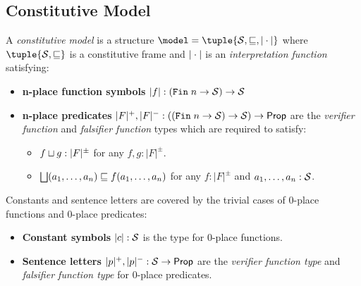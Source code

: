 \documentclass[../LogosReference.tex]{subfiles}
\begin{document}
\subsection{Constitutive Model}\label{sec:constitutive-model}



\begin{definition}\label{def:constitutive-model}
	A \emph{constitutive model} is a structure $\model = \tuple{\statespace, \parthood, \interp{\cdot}}$ where $\tuple{\statespace, \parthood}$ is a constitutive frame and $|\cdot|$ is an \textit{interpretation function} satisfying:
	\begin{itemize}
		\item \textbf{n-place function symbols} $|f| : (\mathtt{Fin}\;n \to \mathcal{S}) \to \mathcal{S}$
    \item \textbf{n-place predicates} $|{F}|^+, |{F}|^- : ((\mathtt{Fin}\;n \to \mathcal{S}) \to \mathcal{S}) \to \mathsf{Prop}$ are the \textit{verifier function} and \textit{falsifier function} types which are required to satisfy:
		      \begin{itemize}
            \item $f\sqcup g : |F|^\pm$ for any $f, g : |F|^\pm$.
			      \item $\bigsqcup(a_1, \ldots, a_n) \sqsubseteq f(a_1, \ldots, a_n)$ for any $f : |F|^\pm$ and $a_1, \ldots, a_n : \mathcal{S}$.
		      \end{itemize}
	\end{itemize}
\end{definition}

\begin{remark}\label{rem:trivial-cases}
	Constants and sentence letters are covered by the trivial cases of 0-place functions and 0-place predicates:
	\begin{itemize}
		\item \textbf{Constant symbols} $|c| : \mathcal{S}$ is the type for 0-place functions.
		\item \textbf{Sentence letters} $|{p}|^+, |{p}|^- : \mathcal{S} \to \mathsf{Prop}$ are the \textit{verifier function type} and \textit{falsifier function type} for 0-place predicates.
	\end{itemize}
\end{remark}
\end{document}

